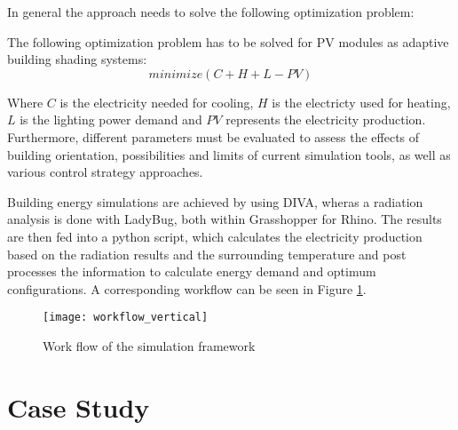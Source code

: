 		In general the approach needs to solve the following optimization problem:

		The following optimization problem has to be solved for PV modules as adaptive building shading systems:\\
		\begin{equation}
				minimize(C+H+L-PV)
		      	\label{e:minimize}
		\end{equation}

		Where $C$ is the electricity needed for cooling, $H$ is the electricty used for heating, $L$ is the lighting power demand and $PV$ represents the electricity production. Furthermore, different parameters must be evaluated to assess the effects of building orientation, possibilities and limits of current simulation tools, as well as various control strategy approaches.

		Building energy simulations are achieved by using DIVA, wheras a radiation analysis is done with LadyBug, both within Grasshopper for Rhino. The results are then fed into a python script, which calculates the electricity production based on the radiation results and the surrounding temperature and post processes the information to calculate energy demand and optimum configurations. A corresponding workflow can be seen in Figure \ref{fig:workflow}. 

		\begin{figure}[ht] %
		\begin{center}
			\texttt{[image: workflow\_vertical]}
			\caption{Work flow of the simulation framework}
			\label{fig:workflow}
		\end{center} 
		\end{figure}

	\section{Case Study}

